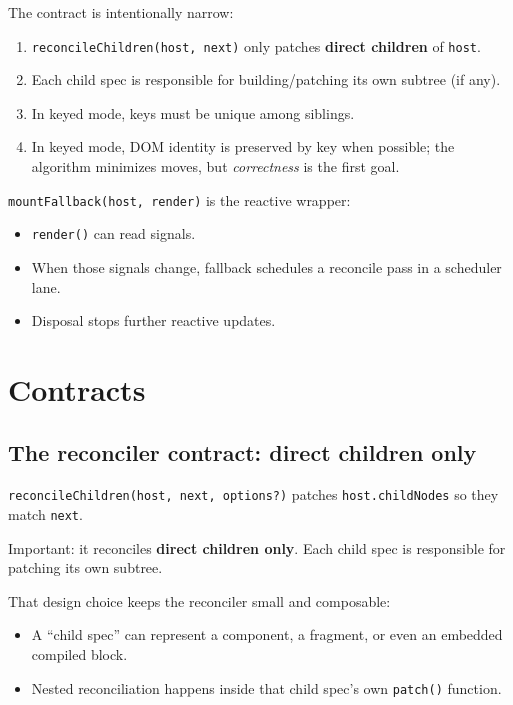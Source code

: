 The contract is intentionally narrow:

\begin{enumerate}
  \item \texttt{reconcileChildren(host, next)} only patches \textbf{direct children} of \texttt{host}.
  \item Each child spec is responsible for building/patching its own subtree (if any).
  \item In keyed mode, keys must be unique among siblings.
  \item In keyed mode, DOM identity is preserved by key when possible; the algorithm minimizes moves, but \emph{correctness} is the first goal.
\end{enumerate}

        \texttt{mountFallback(host, render)} is the reactive wrapper:

\begin{itemize}
  \item \texttt{render()} can read signals.
  \item When those signals change, fallback schedules a reconcile pass in a scheduler lane.
  \item Disposal stops further reactive updates.
\end{itemize}

\section{Contracts}

\subsection{The reconciler contract: direct children only}

\texttt{reconcileChildren(host, next, options?)} patches \texttt{host.childNodes} so they match \texttt{next}.

Important: it reconciles \textbf{direct children only}. Each child spec is responsible for patching its own subtree.

That design choice keeps the reconciler small and composable:

\begin{itemize}
  \item A “child spec” can represent a component, a fragment, or even an embedded compiled block.
  \item Nested reconciliation happens inside that child spec’s own \texttt{patch()} function.
\end{itemize}

